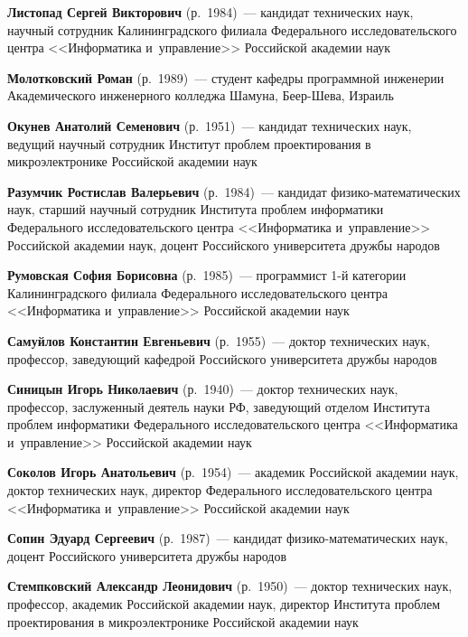 \begin{multicols}{2}
\noindent
\textbf{Листопад Сергей Викторович} (р.\ 1984)~---
кандидат технических наук, научный сотрудник Калининградского филиала Федерального 
исследовательского центра <<Информатика и~управ\-ле\-ние>> Российской академии наук

\noindent
\textbf{Молотковский Роман} (р.\ 1989)~---
студент кафедры программной инженерии Академического инженерного колледжа Шамуна, 
Беер-Шева, Израиль

\noindent
\textbf{Окунев Анатолий Семенович} (р.\ 1951)~---
 кандидат технических наук, ведущий научный сотрудник Институт проб\-лем 
 проектирования в микроэлектронике Российской академии наук
 
  \noindent
\textbf{Разумчик Ростислав Валерьевич} (р.\ 1984)~---
кандидат фи\-зи\-ко-ма\-те\-ма\-ти\-че\-ских наук,
старший научный сотрудник Института проб\-лем 
информатики Федерального исследовательского центра <<Информатика и~управ\-ление>> 
Российской академии наук, доцент
Российского университета дружбы народов


 
 \noindent
\textbf{Румовская София Борисовна} (р.\ 1985)~---
программист 1-й категории Калининградского филиала Федерального исследовательского 
центра <<Информатика и~управ\-ле\-ние>> Российской академии наук

\noindent
\textbf{Самуйлов Константин Евгеньевич} (р.\ 1955)~---
доктор технических наук, профессор, заведующий ка\-фед\-рой Российского 
университета дружбы народов 

\noindent
  \textbf{Синицын Игорь Николаевич} (р.\ 1940)~--- доктор технических наук,
  профессор, заслуженный деятель науки РФ, заведующий отделом Института
  проб\-лем информатики Федерального исследовательского центра
  <<Информатика и~управ\-ле\-ние>> Российской академии наук
  
  \noindent
\textbf{Соколов Игорь Анатольевич} (р.\ 1954)~---
академик Российской академии наук, доктор технических наук, директор Федерального 
исследовательского центра <<Информатика и~управ\-ле\-ние>> Российской академии наук

\columnbreak 
  
  \noindent
\textbf{Сопин Эдуард Сергеевич} (р.\ 1987)~--- кандидат 
фи\-зи\-ко-ма\-те\-ма\-ти\-че\-ских наук, доцент Российского университета дружбы народов
 
 \noindent
\textbf{Стемпковский Александр Леонидович} (р.\ 1950)~--- 
доктор технических наук, профессор, академик Российской академии наук, директор Института проб\-лем 
проектирования в микроэлектронике Российской академии наук


\end{multicols}
